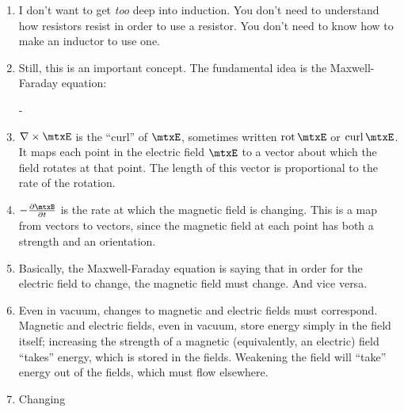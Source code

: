 \documentclass[11pt, oneside]{amsart}
\begin{document}
\begin{enumerate}
  \item I don't want to get \emph{too} deep into induction. You don't
  need to understand how resistors resist in order to use a resistor.
  You don't need to know how to make an inductor to use one.

  \item Still, this is an important concept. The fundamental idea is
  the Maxwell-Faraday equation:

  \begin{nedqn}
    \grad \times \mtxE
  \eqcol
    - 
  \end{nedqn}

  \item $\grad \times \mtxE$ is the ``curl'' of $\mtxE$, sometimes
  written $\operatorname{rot} \mtxE$ or $\operatorname{curl} \mtxE$. It
  maps each point in the electric field $\mtxE$ to a vector about which
  the field rotates at that point. The length of this vector is
  proportional to the rate of the rotation.

  \item $-\fpartial[\mtxB]{t}$ is the rate at which the magnetic field
  is changing. This is a map from vectors to vectors, since the magnetic
  field at each point has both a strength and an orientation.

  \item Basically, the Maxwell-Faraday equation is saying that in order
  for the electric field to change, the magnetic field must change. And
  vice versa.

  \item Even in vacuum, changes to magnetic and electric fields must
  correspond. Magnetic and electric fields, even in vacuum, store energy
  simply in the field itself; increasing the strength of a magnetic
  (equivalently, an electric) field ``takes'' energy, which is stored in
  the fields. Weakening the field will ``take'' energy out of the
  fields, which must flow elsewhere.

  \item Changing
\end{enumerate}
\end{document}
